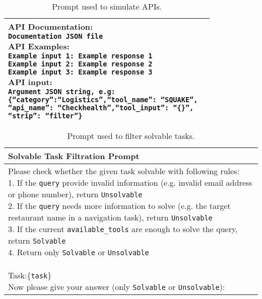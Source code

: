 \begin{table*}[ht!]
\begin{tabular}{p{}p{}}
{    API Documentation:\\
    \texttt{Documentation JSON file}\\
    API Examples: \\
    \texttt{Example input 1: Example response 1}\\
    \texttt{Example input 2: Example response 2}\\
    \texttt{Example input 3: Example response 3}\\
    API input:\\
    \texttt{Argument JSON string, e.g:} \\
    \texttt{\{``category'':``Logistics'',}\texttt{``tool\_name'': ``SQUAKE'',}\\
    \texttt{``api\_name'': ``Checkhealth'',``tool\_input'': ``\{\}'',}\\
    \texttt{``strip'': ``filter''\}}
    } \\
    \bottomrule
    \end{tabular}
    \caption{Prompt used to simulate APIs.}
    \label{tab:prompt_simulate_api}
\end{table*}

\begin{table*}[ht!]
    \centering
    \begin{tabular}{l}
    \toprule
    \rowcolor[gray]{0.95} 
    \textbf{Solvable Task Filtration Prompt} \\
    \midrule
    \makecell[l{p{\textwidth}}]{
    Please check whether the given task solvable with following rules:\\
    1. If the \texttt{query} provide invalid information (e.g. invalid email address or phone number), return \texttt{Unsolvable}\\
    2. If the \texttt{query} needs more information to solve (e.g. the target restaurant name in a navigation task), return \texttt{Unsolvable} \\
    3. If the current \texttt{available\_tools} are enough to solve the query, return \texttt{Solvable} \\
    4. Return only \texttt{Solvable} or \texttt{Unsolvable} \\
    \\
    Task:\{\texttt{task}\}
    \\
    Now please give your answer (only \texttt{Solvable} or \texttt{Unsolvable}):
}
    \\
    \bottomrule
    \end{tabular}
    \caption{Prompt used to filter solvable tasks.}
    \label{tab:task_solvability}
\end{table*}

